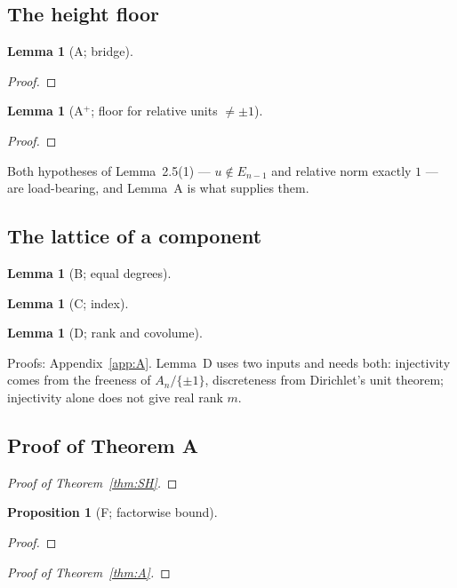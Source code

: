 \documentclass[11pt]{amsart}
\newtheorem{proposition}[theorem]{Proposition}
\newtheorem{lemma}[theorem]{Lemma}
\theoremstyle{remark}\newtheorem{remark}[theorem]{Remark}
\theoremstyle{definition}\newtheorem{definition}[theorem]{Definition}
\providecommand{\proofsdir}{../../proofs} %
\begin{document}
\subsection{The height floor}
\begin{lemma}[A; bridge]\label{lem:A}

\end{lemma}
\begin{proof}

\end{proof}
\begin{lemma}[A$^+$; floor for relative units $\ne\pm1$]\label{lem:Aplus}

\end{lemma}
\begin{proof}

\end{proof}
Both hypotheses of \cite{MO16} Lemma~2.5(1) --- $u\notin E_{n-1}$ and relative norm exactly $1$ --- are load-bearing, and Lemma~A is what supplies them.

\subsection{The lattice of a component}
\begin{lemma}[B; equal degrees]\label{lem:B}

\end{lemma}
\begin{lemma}[C; index]\label{lem:C}

\end{lemma}
\begin{lemma}[D; rank and covolume]\label{lem:D}

\end{lemma}
Proofs: Appendix~\ref{app:A}. Lemma~D uses two inputs and needs both: injectivity comes from the freeness of $A_n/\{\pm1\}$, discreteness from Dirichlet's unit theorem; injectivity alone does not give real rank $m$.

\subsection{Proof of Theorem A}\label{sec:proofA}
\begin{proof}[Proof of Theorem~\ref{thm:SH}]

\end{proof}
\begin{proposition}[F; factorwise bound]\label{prop:F}

\end{proposition}
\begin{proof}

\end{proof}
\begin{proof}[Proof of Theorem~\ref{thm:A}]

\end{proof}
\end{document}
